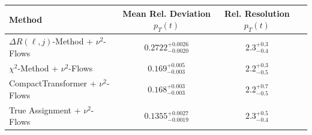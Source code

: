     \begin{tabular}{lccc}
        \toprule
        Method & Mean Rel. Deviation $p_{T}(t)$ & Rel. Resolution $p_{T}(t)$ \\
        \midrule
        $\Delta R(\ell,j)$-Method + $\nu^2$-Flows & $0.2722^{+0.0026}_{-0.0020}$ & $2.3^{+0.3}_{-0.4}$ \\
        $\chi^2$-Method + $\nu^2$-Flows & $0.169^{+0.005}_{-0.003}$ & $2.2^{+0.3}_{-0.5}$ \\
        CompactTransformer + $\nu^2$-Flows & $0.168^{+0.003}_{-0.003}$ & $2.2^{+0.7}_{-0.5}$ \\
        True Assignment + $\nu^2$-Flows & $0.1355^{+0.0027}_{-0.0019}$ & $2.3^{+0.5}_{-0.4}$ \\
        \bottomrule
    \end{tabular}